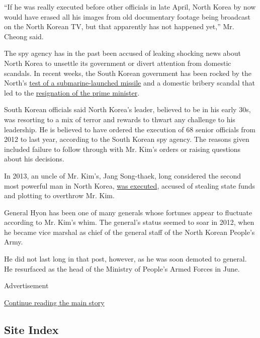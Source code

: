 ``If he was really executed before other officials in late April, North
Korea by now would have erased all his images from old documentary
footage being broadcast on the North Korean TV, but that apparently has
not happened yet,'' Mr. Cheong said.

The spy agency has in the past been accused of leaking shocking news
about North Korea to unsettle its government or divert attention from
domestic scandals. In recent weeks, the South Korean government has been
rocked by the North's
\href{http://www.nytimes3xbfgragh.onion/2015/05/09/world/asia/north-korea-says-it-test-fired-missile-from-submarine.html}{test
of a submarine-launched missile} and a domestic bribery scandal that led
to the
\href{http://www.nytimes3xbfgragh.onion/2015/04/21/world/asia/south-korean-premier-offers-his-resignation.html}{resignation
of the prime minister}.

South Korean officials said North Korea's leader, believed to be in his
early 30s, was resorting to a mix of terror and rewards to thwart any
challenge to his leadership. He is believed to have ordered the
execution of 68 senior officials from 2012 to last year, according to
the South Korean spy agency. The reasons given included failure to
follow through with Mr. Kim's orders or raising questions about his
decisions.

In 2013, an uncle of Mr. Kim's, Jang Song-thaek, long considered the
second most powerful man in North Korea,
\href{http://www.nytimes3xbfgragh.onion/2013/12/13/world/asia/north-korea-says-uncle-of-executed.html}{was
executed}, accused of stealing state funds and plotting to overthrow Mr.
Kim.

General Hyon has been one of many generals whose fortunes appear to
fluctuate according to Mr. Kim's whim. The general's status seemed to
soar in 2012, when he became vice marshal as chief of the general staff
of the North Korean People's Army.

He did not last long in that post, however, as he was soon demoted to
general. He resurfaced as the head of the Ministry of People's Armed
Forces in June.

Advertisement

\protect\hyperlink{after-bottom}{Continue reading the main story}

\hypertarget{site-index}{%
\subsection{Site Index}\label{site-index}}

